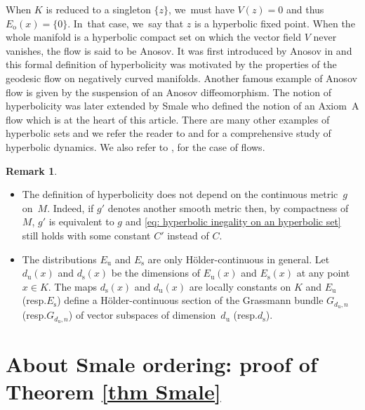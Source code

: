 \documentclass[11pt]{article}
\newcommand{\resp}{resp.\xspace}
\newcommand{\skpt}{\smallskip}
\newcommand{\ro}{\mathrm{o}}
\newcommand{\rs}{\mathrm{s}}
\newcommand{\ru}{\mathrm{u}}
\theoremstyle{definition}
\newtheorem{remark}[definition]{Remark}
\theoremstyle{plain}
\begin{document}
\begin{appendix}
When $K$ is reduced to a singleton $\{z\}$, we~must have $V(z) \!=\! 0$ and thus \hbox{$E_\ro (x) \!=\! \{0\}$}. In~that case, we~say that $z$ is a hyperbolic fixed point. When the whole manifold is a hyperbolic compact set on which the vector field $V$ never vanishes, the flow is said to be Anosov. It was first introduced by Anosov in \cite{anosov} and this formal definition of hyperbolicity was motivated by the properties of the geodesic flow on negatively curved manifolds. Another famous example of Anosov flow is given by the suspension of an Anosov diffeomorphism. The notion of hyperbolicity was later extended by Smale who defined the notion of an Axiom~A flow which is at the heart of this article. There are many other examples of hyperbolic sets and we refer the reader to \cite{katok-hasselblatt} and \cite{palis-demelo} for a comprehensive study of hyperbolic dynamics. We also refer to \cite{dyatlov}, \cite{FH} for the case of flows.

\skpt
\begin{remark}
\begin{itemize}
\item The definition of hyperbolicity does not depend on the continuous metric~$g$ on~$M$. Indeed, if $g'$ denotes another smooth metric then, by compactness of $M$, $g'$ is equivalent to $g$ and \eqref{eq: hyperbolic inegality on an hyperbolic set} still holds with some constant $C'$ instead of $C$.
\item The distributions $E_\ru$ and $E_\rs$ are only Hölder-continuous in general. Let $d_\ru (x)$ and $d_\rs (x)$ be the dimensions of $E_\ru (x)$ and $E_\rs (x)$ at any point $x \in K$. The maps $d_\rs (x)$ and $d_\ru (x)$ are locally constants on $K$ and $E_\ru$ (\resp $E_\rs$) define a Hölder-continuous section of the Grassmann bundle $G_{d_\ru, n}$ (\resp $G_{d_\ru, n}$) of vector subspaces of dimension~$d_\ru$ (\resp $d_\rs$).
\end{itemize}
\end{remark}

\section{About Smale ordering: proof of Theorem \ref{thm Smale}}


\end{appendix}
\end{document}
